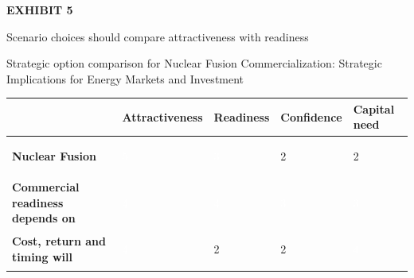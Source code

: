 \documentclass[10pt,a4paper]{article}
\begin{document}
\clearpage
{\textcolor{BOGreen}{\scriptsize\bfseries EXHIBIT 5}}\par\vspace{4pt}
{\sffamily\fontsize{17}{21}\selectfont\color{BONavy} Scenario choices should compare attractiveness with readiness}\par
{\small\color{BOText} Strategic option comparison for Nuclear Fusion Commercialization: Strategic Implications for Energy Markets and Investment}\par\vspace{6pt}
{\scriptsize\begin{tabular}{p{38mm}>{\centering\arraybackslash}p{21mm}>{\centering\arraybackslash}p{21mm}>{\centering\arraybackslash}p{21mm}>{\centering\arraybackslash}p{21mm}}
 & {\bfseries Attractiveness} & {\bfseries Readiness} & {\bfseries Confidence} & {\bfseries Capital need} \\
\hline
{\bfseries Nuclear Fusion} & \colorbox{BOGreen}{\textcolor{white}{\strut\hspace{5pt}5\hspace{5pt}}} & \colorbox{BOBlue}{\textcolor{white}{\strut\hspace{5pt}3\hspace{5pt}}} & \colorbox{BOLight}{\textcolor{BOText}{\strut\hspace{5pt}2\hspace{5pt}}} & \colorbox{BOLight}{\textcolor{BOText}{\strut\hspace{5pt}2\hspace{5pt}}} \\
{\bfseries Commercial readiness depends on} & \colorbox{BOGreen}{\textcolor{white}{\strut\hspace{5pt}4\hspace{5pt}}} & \colorbox{BOGreen}{\textcolor{white}{\strut\hspace{5pt}4\hspace{5pt}}} & \colorbox{BOBlue}{\textcolor{white}{\strut\hspace{5pt}3\hspace{5pt}}} & \colorbox{BOBlue}{\textcolor{white}{\strut\hspace{5pt}3\hspace{5pt}}} \\
{\bfseries Cost, return and timing will} & \colorbox{BOGreen}{\textcolor{white}{\strut\hspace{5pt}4\hspace{5pt}}} & \colorbox{BOLight}{\textcolor{BOText}{\strut\hspace{5pt}2\hspace{5pt}}} & \colorbox{BOLight}{\textcolor{BOText}{\strut\hspace{5pt}2\hspace{5pt}}} & \colorbox{BOGreen}{\textcolor{white}{\strut\hspace{5pt}4\hspace{5pt}}} \\

\end{tabular}}
\end{document}
